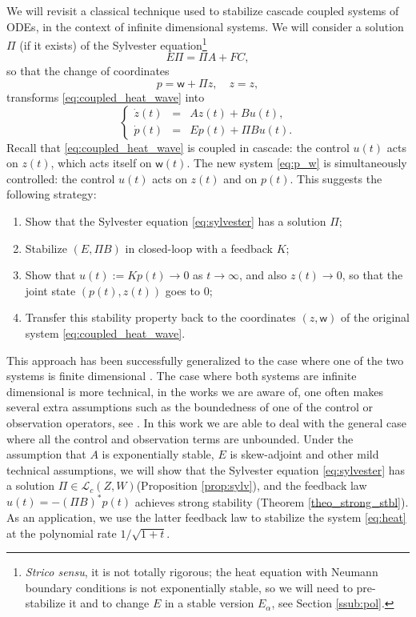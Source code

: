 \documentclass[10pt]{article}
\begin{document}
We will revisit a classical technique used to stabilize cascade coupled systems of ODEs, in the context of infinite dimensional systems. We will consider a solution $\Pi$ (if it exists) of the Sylvester equation\footnote{\textit{Strico sensu}, it is not totally rigorous; the heat equation with Neumann boundary conditions is not exponentially stable, so we will need to pre-stabilize it and to change $E$ in a stable version $E_\alpha$, see Section \ref{ssub:pol}.} 
\begin{equation}\label{eq:sylvester}
E \Pi = \Pi A + FC,
\end{equation}
so that the change of coordinates
\begin{equation}\label{eq:change_variable}
p = \mathsf{w} + \Pi z, \quad z=z,
\end{equation}
transforms \eqref{eq:coupled_heat_wave} into 
\begin{equation}\label{eq:p_w}
\left\lbrace \begin{array}{rcl}
\dot{z}(t) &=& Az(t) + Bu(t), \\
\dot{p}(t) &=& Ep(t) + \Pi Bu(t).
\end{array}\right.
\end{equation}
Recall that \eqref{eq:coupled_heat_wave} is coupled in cascade: the control $u(t)$ acts on $z(t)$, which acts itself on $\mathsf{w}(t)$. The new system \eqref{eq:p_w} is simultaneously controlled: the control $u(t)$ acts on $z(t)$ and on $p(t)$. This suggests the following strategy:
\begin{enumerate}
\item Show that the Sylvester equation \eqref{eq:sylvester} has a solution $\Pi$;
\item Stabilize $(E,\Pi B)$ in closed-loop with a feedback $K$;
\item Show that $u(t) := Kp(t) \rightarrow 0$ as $t \rightarrow \infty$, and also $z(t) \rightarrow 0$, so that the joint state $(p(t),z(t))$ goes to 0;
\item Transfer this stability property back to the coordinates $(z,\mathsf{w})$ of the original system \eqref{eq:coupled_heat_wave}.
\end{enumerate}
This approach has been successfully generalized to the case where one of the two systems is finite dimensional \cite{natarajan,paunonen2015controller}. The case where both systems are infinite dimensional is more technical, in the works we are aware of, one often makes several extra assumptions such as the boundedness of one of the control or observation operators, see \cite{paunonen2017robust,sylv_PDEPDE,emirsajlow}. In this work we are able to deal with the general case where all the control and observation terms are unbounded. Under the assumption that $A$ is exponentially stable, $E$ is skew-adjoint and other mild technical assumptions, we will show that the Sylvester equation \eqref{eq:sylvester} has a solution $\Pi \in \mathcal{L}_c(Z,W)$(Proposition \ref{prop:sylv}), and the feedback law $u(t) = -(\Pi B)^* p(t)$ achieves strong stability (Theorem \ref{theo_strong_stbl}). As an application, we use the latter feedback law to stabilize the system \eqref{eq:heat} at the polynomial rate $1/\sqrt{1+t}$.
\end{document}
